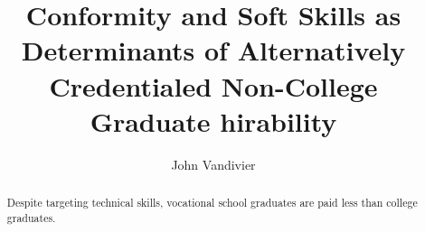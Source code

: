 \documentclass[review]{elsarticle}
\begin{document}
\begin{frontmatter}

    \title{
        Conformity and Soft Skills as Determinants of Alternatively Credentialed Non-College Graduate hirability
    }

    \author[mymainaddress]{John Vandivier}
    \address[mymainaddress]{4400 University Dr, Fairfax, VA 22030}

    \begin{abstract}
        Despite targeting technical skills,
        vocational school graduates are paid less than college graduates.

\end{abstract}
\end{frontmatter}
\end{document}
